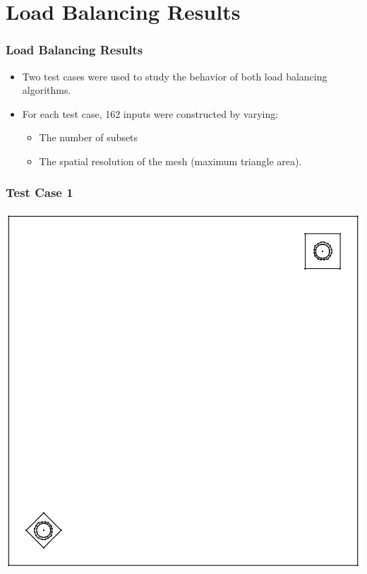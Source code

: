 \documentclass[compress]{beamer}
\begin{document}
\section{Load Balancing Results}
\begin{frame}[t]\frametitle{Load Balancing Results}
\begin{block}{}
\begin{itemize}
	\item Two test cases were used to study the behavior of both load balancing algorithms.
	\item For each test case, 162 inputs were constructed by varying:
		\begin{itemize}
		\item The number of subsets
		\item The spatial resolution of the mesh (maximum triangle area).
		\end{itemize}
\end{itemize}
\end{block}
\end{frame}

\begin{frame}[t]\frametitle{Test Case 1}
\centering
\includegraphics[scale = 0.4]{figures/unbalanced_lattice-eps-converted-to.pdf}
\end{frame}
\end{document}
